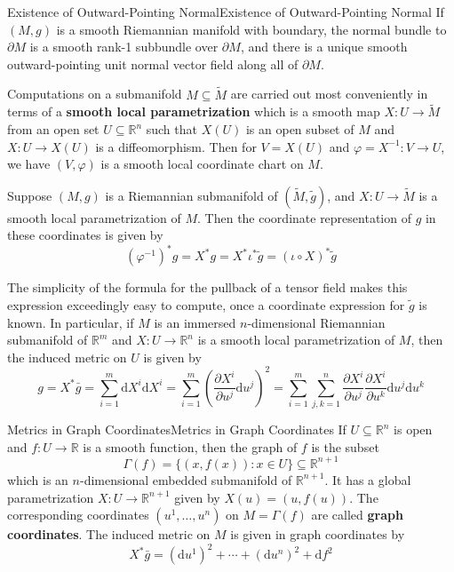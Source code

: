 \documentclass[../main.tex]{subfiles}
\begin{document}
\begin{proposition}{Existence of Outward-Pointing Normal}{Existence of Outward-Pointing Normal}
	If $(M, g)$ is a smooth Riemannian manifold with boundary, the normal bundle to $\partial M$ is a smooth rank-1 subbundle over $\partial M$, and there is a unique smooth outward-pointing unit normal vector field along all of $\partial M$.
\end{proposition}

Computations on a submanifold $M \subseteq \tilde{M}$ are carried out most conveniently in terms of a \textbf{smooth local parametrization} which is a smooth map $X: U \to \tilde{M}$ from an open set $U \subseteq \mathbb{R}^n$ such that $X(U)$ is an open subset of $M$ and $X: U \to X(U)$ is a diffeomorphism. Then for $V = X(U)$ and $\varphi = X^{-1}: V \to U$, we have $(V, \varphi)$ is a smooth local coordinate chart on $M$.

Suppose $(M, g)$ is a Riemannian submanifold of $(\tilde{M}, \tilde{g})$, and $X: U \to \tilde{M}$ is a smooth local parametrization of $M$. Then the coordinate representation of $g$ in these coordinates is given by
\begin{equation}
	(\varphi^{-1})^*g = X^*g = X^*\iota^*\tilde{g} = (\iota \circ X)^*\tilde{g}
\end{equation}

The simplicity of the formula for the pullback of a tensor field makes this expression exceedingly easy to compute, once a coordinate expression for $\tilde{g}$ is known. In particular, if $M$ is an immersed $n$-dimensional Riemannian submanifold of $\mathbb{R}^m$ and $X: U \to \mathbb{R}^n$ is a smooth local parametrization of $M$, then the induced metric on $U$ is given by
\begin{equation}
	g = X^*\bar{g} = \sum_{i=1}^m \mathrm{d}X^i \mathrm{d} X^i = \sum_{i=1}^m \left(\frac{\partial X^i}{\partial u^j} \mathrm{d}u^j\right)^2 = \sum_{i=1}^m \sum_{j, k=1}^n \frac{\partial X^i}{\partial u^j} \frac{\partial X^i}{\partial u^k} \mathrm{d}u^j \mathrm{d}u^k
\end{equation}

\begin{example}{Metrics in Graph Coordinates}{Metrics in Graph Coordinates}
	If $U \subseteq \mathbb{R}^n$ is open and $f: U \to \mathbb{R}$ is a smooth function, then the graph of $f$ is the subset
	\begin{equation}
		\Gamma(f) = \{(x, f(x)) : x \in U\} \subseteq \mathbb{R}^{n+1}
	\end{equation}
	which is an $n$-dimensional embedded submanifold of $\mathbb{R}^{n+1}$. It has a global parametrization $X: U \to \mathbb{R}^{n+1}$ given by $X(u) = (u, f(u))$. The corresponding coordinates $(u^1, \ldots, u^n)$ on $M = \Gamma(f)$ are called \textbf{graph coordinates}. The induced metric on $M$ is given in graph coordinates by
	\begin{equation*}
		X^*\bar{g} = (\mathrm{d} u^1)^2 + \cdots + (\mathrm{d}u^n)^2 + \mathrm{d} f^2
	\end{equation*}
\end{example}
\end{document}
